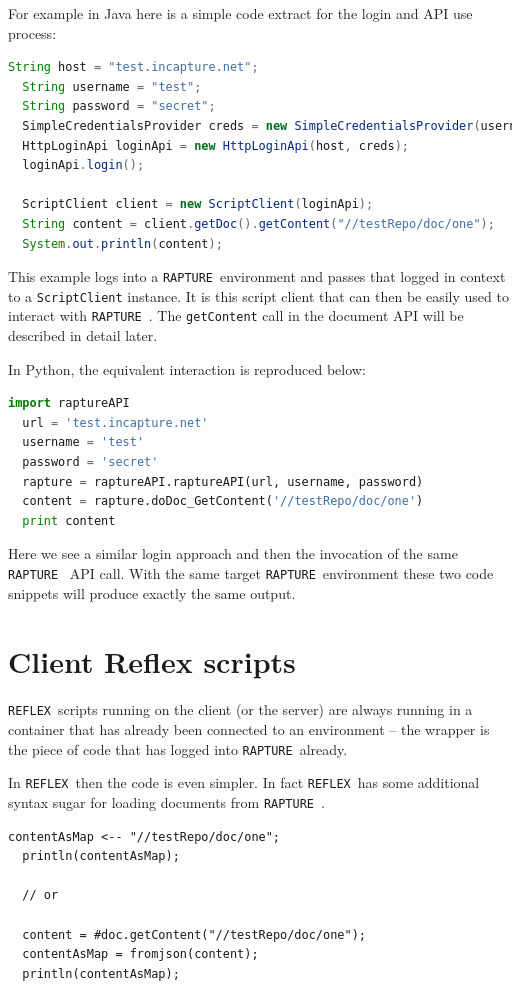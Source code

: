 \documentclass[12pt,twoside,a4paper]{book}
\newcommand{\Rapture}{\Verb+RAPTURE+~}
\newcommand{\Reflex}{\Verb+REFLEX+~}
\begin{document}
For example in Java here is a simple code extract for the login and API use process:

\begin{lstlisting}[caption={Java simple example}, language=Java]
  String host = "test.incapture.net";
  String username = "test";
  String password = "secret";
  SimpleCredentialsProvider creds = new SimpleCredentialsProvider(username, password);
  HttpLoginApi loginApi = new HttpLoginApi(host, creds);
  loginApi.login();

  ScriptClient client = new ScriptClient(loginApi);
  String content = client.getDoc().getContent("//testRepo/doc/one");
  System.out.println(content);
\end{lstlisting}

This example logs into a \Rapture environment and passes that logged in context to a \verb+ScriptClient+
instance. It is this script client that can then be easily used to interact with \Rapture. The
\verb+getContent+ call in the document API will be described in detail later.

In Python, the equivalent interaction is reproduced below:

\begin{lstlisting}[caption={Python simple example}, language=Python]
  import raptureAPI
  url = 'test.incapture.net'
  username = 'test'
  password = 'secret'
  rapture = raptureAPI.raptureAPI(url, username, password)
  content = rapture.doDoc_GetContent('//testRepo/doc/one')
  print content
\end{lstlisting}

Here we see a similar login approach and then the invocation of the same \Rapture
API call. With the same target \Rapture environment these two code snippets will
produce exactly the same output.

\section{Client Reflex scripts}

\Reflex scripts running on the client (or the server) are always running in a
container that has already been connected to an environment -- the wrapper is
the piece of code that has logged into \Rapture already.

In \Reflex then the code is even simpler. In fact \Reflex has some additional
syntax sugar for loading documents from \Rapture.

\begin{lstlisting}[caption={Reflex simple example}, language=reflex]
  contentAsMap <-- "//testRepo/doc/one";
  println(contentAsMap);

  // or

  content = #doc.getContent("//testRepo/doc/one");
  contentAsMap = fromjson(content);
  println(contentAsMap);
\end{lstlisting}
\end{document}
